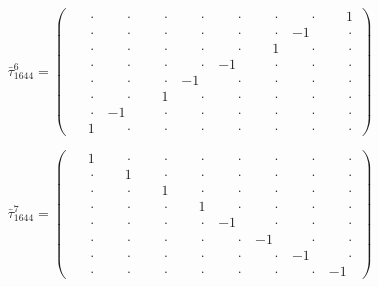 \documentclass[
  10pt,
]{article}
\begin{document}
\[
\bar\tau_{1644}^{6} = \left(\begin{array}{rrrr|rrrr}
\phantom{-}\cdot & \phantom{-}\cdot & \phantom{-}\cdot & \phantom{-}\cdot & \phantom{-}\cdot & \phantom{-}\cdot & \phantom{-}\cdot & \phantom{-}1 \\[-1.8pt]
\phantom{-}\cdot & \phantom{-}\cdot & \phantom{-}\cdot & \phantom{-}\cdot & \phantom{-}\cdot & \phantom{-}\cdot & -1 & \phantom{-}\cdot \\[-1.8pt]
\phantom{-}\cdot & \phantom{-}\cdot & \phantom{-}\cdot & \phantom{-}\cdot & \phantom{-}\cdot & \phantom{-}1 & \phantom{-}\cdot & \phantom{-}\cdot \\[-1.8pt]
\phantom{-}\cdot & \phantom{-}\cdot & \phantom{-}\cdot & \phantom{-}\cdot & -1 & \phantom{-}\cdot & \phantom{-}\cdot & \phantom{-}\cdot \\[-1.8pt]
\hline
\phantom{-}\cdot & \phantom{-}\cdot & \phantom{-}\cdot & -1 & \phantom{-}\cdot & \phantom{-}\cdot & \phantom{-}\cdot & \phantom{-}\cdot \\[-1.8pt]
\phantom{-}\cdot & \phantom{-}\cdot & \phantom{-}1 & \phantom{-}\cdot & \phantom{-}\cdot & \phantom{-}\cdot & \phantom{-}\cdot & \phantom{-}\cdot \\[-1.8pt]
\phantom{-}\cdot & -1 & \phantom{-}\cdot & \phantom{-}\cdot & \phantom{-}\cdot & \phantom{-}\cdot & \phantom{-}\cdot & \phantom{-}\cdot \\[-1.8pt]
\phantom{-}1 & \phantom{-}\cdot & \phantom{-}\cdot & \phantom{-}\cdot & \phantom{-}\cdot & \phantom{-}\cdot & \phantom{-}\cdot & \phantom{-}\cdot
\end{array}\right)
\]

\[
\bar\tau_{1644}^{7} = \left(\begin{array}{rrrr|rrrr}
\phantom{-}1 & \phantom{-}\cdot & \phantom{-}\cdot & \phantom{-}\cdot & \phantom{-}\cdot & \phantom{-}\cdot & \phantom{-}\cdot & \phantom{-}\cdot \\[-1.8pt]
\phantom{-}\cdot & \phantom{-}1 & \phantom{-}\cdot & \phantom{-}\cdot & \phantom{-}\cdot & \phantom{-}\cdot & \phantom{-}\cdot & \phantom{-}\cdot \\[-1.8pt]
\phantom{-}\cdot & \phantom{-}\cdot & \phantom{-}1 & \phantom{-}\cdot & \phantom{-}\cdot & \phantom{-}\cdot & \phantom{-}\cdot & \phantom{-}\cdot \\[-1.8pt]
\phantom{-}\cdot & \phantom{-}\cdot & \phantom{-}\cdot & \phantom{-}1 & \phantom{-}\cdot & \phantom{-}\cdot & \phantom{-}\cdot & \phantom{-}\cdot \\[-1.8pt]
\hline
\phantom{-}\cdot & \phantom{-}\cdot & \phantom{-}\cdot & \phantom{-}\cdot & -1 & \phantom{-}\cdot & \phantom{-}\cdot & \phantom{-}\cdot \\[-1.8pt]
\phantom{-}\cdot & \phantom{-}\cdot & \phantom{-}\cdot & \phantom{-}\cdot & \phantom{-}\cdot & -1 & \phantom{-}\cdot & \phantom{-}\cdot \\[-1.8pt]
\phantom{-}\cdot & \phantom{-}\cdot & \phantom{-}\cdot & \phantom{-}\cdot & \phantom{-}\cdot & \phantom{-}\cdot & -1 & \phantom{-}\cdot \\[-1.8pt]
\phantom{-}\cdot & \phantom{-}\cdot & \phantom{-}\cdot & \phantom{-}\cdot & \phantom{-}\cdot & \phantom{-}\cdot & \phantom{-}\cdot & -1
\end{array}\right)
\]
\end{document}
